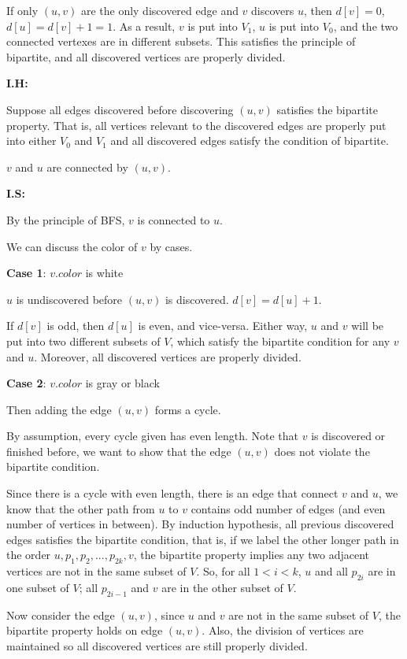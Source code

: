 \documentclass[11pt, answers]{exam}
\theoremstyle{plain}
\theoremstyle{definition}
\begin{document}
\begin{questions}
\begin{solution}
\begin{parts}
If only $(u,v)$ are the only discovered edge and $v$ discovers $u$, then $d[v] = 0$, $d[u] = d[v] + 1 = 1$. As a result, $v$ is put into $V_1$, $u$ is put into $V_0$, and the two connected vertexes are in different subsets. This satisfies the principle of bipartite, and all discovered vertices are properly divided.

\textbf{I.H:} 

Suppose all edges discovered before discovering $(u,v)$ satisfies the bipartite property. That is, all vertices relevant to the discovered edges are properly put into either $V_0$ and $V_1$ and all discovered edges satisfy the condition of bipartite. 

$v$ and $u$ are connected by $(u,v)$.

\textbf{I.S:}

By the principle of BFS, $v$ is connected to $u$.

We can discuss the color of $v$ by cases.

\textbf{Case 1}: $v.color$ is white

$u$ is undiscovered before $(u,v)$ is discovered. $d[v] = d[u] + 1$. 

If $d[v]$ is odd, then $d[u]$ is even, and vice-versa. Either way, $u$ and $v$ will be put into two different subsets of $V$, which satisfy the bipartite condition for any $v$ and $u$. Moreover, all discovered vertices are properly divided.

\textbf{Case 2}: $v.color$ is gray or black

Then adding the edge $(u,v)$ forms a cycle. 

By assumption, every cycle given has even length. Note that $v$ is discovered or finished before, we want to show that the edge $(u,v)$ does not violate the bipartite condition.

Since there is a cycle with even length, there is an edge that connect $v$ and $u$, we know that the other path from $u$ to $v$ contains odd number of edges (and even number of vertices in between). By induction hypothesis, all previous discovered edges satisfies the bipartite condition, that is, if we label the other longer path in the order $u, p_1, p_2, ..., p_{2k}, v$, the bipartite property implies any two adjacent vertices are not in the same subset of $V$. So, for all $1 \lt i \lt k$, $u$ and all $p_{2i}$ are in one subset of $V$; all $p_{2i-1}$ and $v$ are in the other subset of $V$. 

Now consider the edge $(u,v)$, since $u$ and $v$ are not in the same subset of $V$, the bipartite property holds on edge $(u,v)$. Also, the division of vertices are maintained so all discovered vertices are still properly divided.


\end{parts}
\end{solution}
\end{questions}
\end{document}
